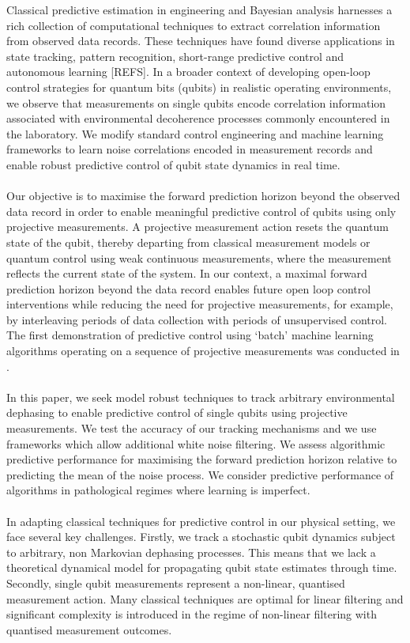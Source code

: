 Classical predictive estimation in engineering and Bayesian analysis harnesses a rich collection of computational techniques to extract correlation information from observed data records. These techniques have found diverse applications in state tracking, pattern recognition, short-range predictive control and autonomous learning [REFS]. In a broader context of developing open-loop control strategies for quantum bits (qubits) in realistic operating environments, we observe that measurements on single qubits encode correlation information associated with environmental decoherence processes commonly encountered in the laboratory. We modify standard control engineering and machine learning frameworks to learn noise correlations encoded in  measurement records and enable robust predictive control of qubit state dynamics in real time.    
\\
\\
Our objective is to maximise the forward prediction horizon beyond the observed data record in order to enable meaningful predictive control of qubits using only projective measurements. A projective measurement action resets the quantum state of the qubit, thereby departing from classical measurement models or quantum control using weak continuous measurements, where the measurement reflects the current state of the system. In our context, a maximal forward prediction horizon beyond the data record enables future open loop control interventions while reducing the need for projective measurements, for example, by interleaving periods of data collection with periods of unsupervised control. The first demonstration of predictive control using `batch' machine learning algorithms operating on a sequence of projective measurements was conducted in  \cite{mavadia2017}. 
\\
\\
In this paper, we seek model robust techniques to track arbitrary environmental dephasing to enable predictive control of single qubits using projective measurements. We test the accuracy of our tracking mechanisms and we use frameworks which allow additional white noise filtering. We assess algorithmic predictive performance for maximising the forward prediction horizon relative to predicting the mean of the noise process. We consider predictive performance of algorithms in pathological regimes where learning is imperfect. 
\\
\\
In adapting classical techniques for predictive control in our physical setting, we face several key challenges. Firstly, we track a stochastic qubit dynamics subject to arbitrary, non Markovian dephasing processes. This means that we lack a theoretical dynamical model for propagating qubit state estimates through time. Secondly, single qubit measurements represent a non-linear, quantised measurement action.  Many classical techniques are optimal for linear filtering and significant complexity is introduced in the regime of non-linear filtering with quantised measurement outcomes. 
